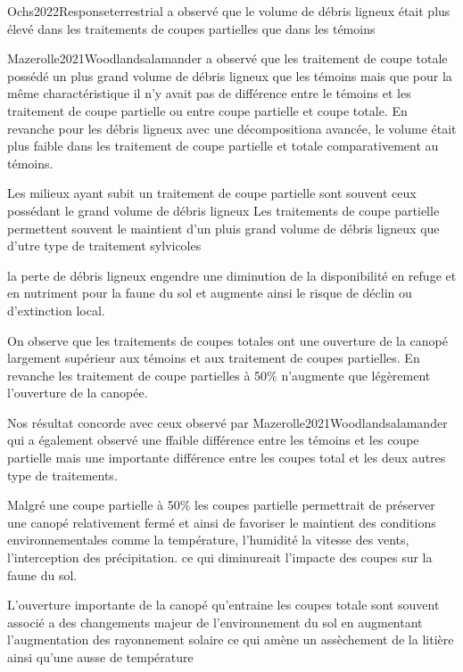 Ochs2022Responseterrestrial a observé que le volume de débris ligneux était plus élevé dans les traitements de coupes partielles que dans les témoins

Mazerolle2021Woodlandsalamander a observé que les traitement de coupe totale possédé un plus grand volume de débris ligneux que les témoins 
mais que pour la même charactéristique il n'y avait pas de différence entre le témoins et les traitement de coupe partielle ou entre coupe partielle et coupe totale.
En revanche pour les débris ligneux avec une décompositiona avancée, le volume était plus faible dans les traitement de coupe partielle et totale comparativement au témoins. 

Les milieux ayant subit un traitement de coupe partielle sont souvent ceux possédant le grand volume de débris ligneux 
Les traitements de coupe partielle permettent souvent le maintient d'un pluis grand volume de débris ligneux que d'utre type de traitement sylvicoles \citep{Nolet2018Comparingeffects}


la perte de débris ligneux engendre une diminution de la disponibilité en refuge et en nutriment pour la faune du sol et augmente ainsi le risque de déclin ou d'extinction local. 

On observe que les traitements de coupes totales ont une ouverture de la canopé largement supérieur aux témoins et aux traitement de coupes partielles.
En revanche les traitement de coupe partielles à 50\% n'augmente que légèrement l'ouverture de la canopée.

Nos résultat concorde avec ceux observé par Mazerolle2021Woodlandsalamander qui a également observé une ffaible différence entre les témoins et 
les coupe partielle mais une importante différence entre les coupes total et les deux autres type de traitements.


Malgré une coupe partielle à 50\% les coupes partielle permettrait de préserver une canopé relativement fermé et ainsi de favoriser le maintient 
des conditions environnementales comme la température, l'humidité la vitesse des vents, l'interception des précipitation. 
ce qui diminureait l'impacte des coupes sur la faune du sol.

L'ouverture importante de la canopé qu'entraine les coupes totale sont souvent associé a des changements majeur de l'environnement du sol en augmentant l'augmentation des rayonnement solaire ce qui amène un assèchement de la litière ainsi qu'une ausse de température \citep{Brooks2008Forestfloor} 


